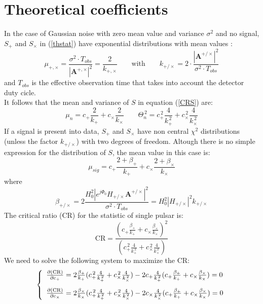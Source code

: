 \documentclass[11pt,a4paper,final]{iopart}
\begin{document}
\section{Theoretical coefficients}\label{appendix:calcoli}
In the case of Gaussian noise with zero mean value and variance $\sigma^2$ and no signal, $S_+$ and $S_\times$ in (\ref{thstat}) have exponential distributions with mean values \cite{2014}:
\begin{equation}
\mu_{+,\times}=\frac{\sigma^2\cdot T_{obs}}{|\textbf{A}^{+,\times}|^2}=\frac{2}{k_{+,\times}} \qquad \text{with} \qquad k_{+/\times}=2 \cdot \frac{|\textbf{A}^{+/\times}|^2}{\sigma^2\cdot T_{obs}}
\end{equation} and $T_{obs}$ is the effective observation time that takes into account the detector duty cicle.
\\It follows that the mean and variance of $S$ in equation (\ref{CRS}) are:
\begin{equation}
\mu_{n}=c_+ \frac{2}{k_+} + c_\times \frac{2}{k_\times} \qquad \Theta_{n}^{\,2}=c_+^{\,2} \frac{4}{k_+^{\,2}} + c_\times^{\,2} \frac{4}{k_\times^{\,2}}
\end{equation}
If a signal is present into data, $S_+$ and $S_\times$ have non central $\chi^2$ distributions (unless the factor $k_{+/\times}$) with two degrees of freedom. Altough there is no simple expression for the distribution of $S$, the mean value in this case is:
\begin{equation}
\mu_{sig}=c_+ \frac{2+\beta_+}{k_+} + c_\times \frac{2+\beta_\times}{k_\times}
\end{equation}where\begin{equation}
\beta_{+/\times}=2\frac{H_0^2|e^{j\Phi_0}H_{+/\times}\textbf{A}^{+/\times}|^2}{\sigma^2\cdot T_{obs}}=H_0^2|H_{+/\times}|^2k_{+/\times}
\end{equation}
The critical ratio ($\textrm{CR}$) for the statistic of single pulsar is:
\begin{equation}
 \textrm{CR}= \frac{\left( c_+ \frac{\beta_+}{k_+} + c_\times \frac{\beta_\times}{k_\times}\right)^2}{\left(c_+^{\,2} \frac{4}{k_+^{\,2}} + c_\times^{\,2} \frac{4}{k_\times^{\,2}}\right)} 
\end{equation}
We need to solve the following system to maximize the $\textrm{CR}$:
\begin{equation}
\left\{ \begin{array}{lr} \frac{\partial (\textrm{CR})}{\partial c_+} = 2\frac{\beta_+}{k_+}(c_+^{\,2}\frac{4}{k_+^{\,2}}+c_\times^{\,2}\frac{4}{k_\times^{\,2}})-2c_+\frac{4}{k_+^{\,2}}(c_+\frac{\beta_+}{k_+}+c_\times\frac{\beta_\times}{k_\times}) =0   \vspace*{0.3cm}\\ \frac{\partial (\textrm{CR})}{\partial c_\times} = 2\frac{\beta_\times}{k_\times}(c_+^{\,2}\frac{4}{k_+^{\,2}}+c_\times^{\,2}\frac{4}{k_\times^{\,2}})-2c_\times\frac{4}{k_\times^{\,2}}(c_+\frac{\beta_+}{k_+}+c_\times\frac{\beta_\times}{k_\times}) = 0 \end{array}\right. 
\end{equation}
\end{document}
